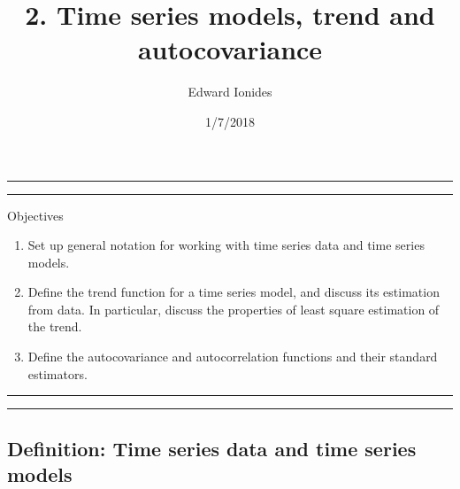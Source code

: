 \documentclass[]{article}
\title{2. Time series models, trend and autocovariance}
\author{Edward Ionides}
\date{1/7/2018}
\begin{document}
\maketitle

{
\setcounter{tocdepth}{2}
\tableofcontents
}
\newcommand\E{\mathbb{E}}
\newcommand\prob{\mathbb{P}}
\newcommand\var{\mathrm{Var}}
\newcommand\cov{\mathrm{Cov}}
\newcommand\loglik{\ell}
\newcommand\R{\mathbb{R}}
\newcommand\data[1]{#1^*}
\newcommand\estimate[1]{\data{#1}}
\newcommand\given{\, ; \,}
\newcommand\transpose{\scriptsize{T}}
\newcommand\mycolon{\,{:}\,}





\begin{center}\rule{0.5\linewidth}{\linethickness}\end{center}

\begin{center}\rule{0.5\linewidth}{\linethickness}\end{center}

Objectives

\begin{enumerate}
\def\labelenumi{\arabic{enumi}.}
\item
  Set up general notation for working with time series data and time
  series models.
\item
  Define the trend function for a time series model, and discuss its
  estimation from data. In particular, discuss the properties of least
  square estimation of the trend.
\item
  Define the autocovariance and autocorrelation functions and their
  standard estimators.
\end{enumerate}

\begin{center}\rule{0.5\linewidth}{\linethickness}\end{center}

\begin{center}\rule{0.5\linewidth}{\linethickness}\end{center}

\subsection{Definition: Time series data and time series
models}\label{definition-time-series-data-and-time-series-models}
\end{document}
